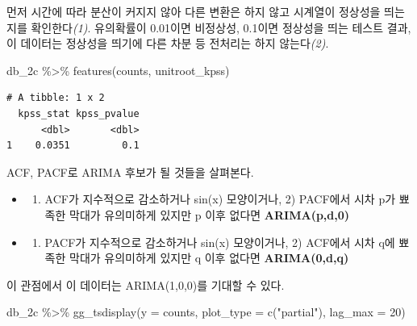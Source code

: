 \documentclass[
  letterpaper,
  DIV=11,
  numbers=noendperiod]{scrreprt}
\newenvironment{Shaded}{\begin{snugshade}}{\end{snugshade}}
\newcommand{\AttributeTok}[1]{\textcolor[rgb]{0.40,0.45,0.13}{#1}}
\newcommand{\DecValTok}[1]{\textcolor[rgb]{0.68,0.00,0.00}{#1}}
\newcommand{\FunctionTok}[1]{\textcolor[rgb]{0.28,0.35,0.67}{#1}}
\newcommand{\NormalTok}[1]{\textcolor[rgb]{0.00,0.23,0.31}{#1}}
\newcommand{\SpecialCharTok}[1]{\textcolor[rgb]{0.37,0.37,0.37}{#1}}
\newcommand{\StringTok}[1]{\textcolor[rgb]{0.13,0.47,0.30}{#1}}
\providecommand{\tightlist}{%
  \setlength{\itemsep}{0pt}\setlength{\parskip}{0pt}}\usepackage{longtable,booktabs,array}
\begin{document}
먼저 시간에 따라 분산이 커지지 않아 다른 변환은 하지 않고 시계열이
정상성을 띄는 지를 확인한다\emph{(1)}. 유의확률이 0.01이면 비정상성,
0.1이면 정상성을 띄는 테스트 결과, 이 데이터는 정상성을 띄기에 다른 차분
등 전처리는 하지 않는다\emph{(2)}.

\begin{Shaded}
\begin{Highlighting}[]
\NormalTok{db\_2c }\SpecialCharTok{\%\textgreater{}\%}
  \FunctionTok{features}\NormalTok{(counts, unitroot\_kpss)}
\end{Highlighting}
\end{Shaded}

\begin{verbatim}
# A tibble: 1 x 2
  kpss_stat kpss_pvalue
      <dbl>       <dbl>
1    0.0351         0.1
\end{verbatim}

ACF, PACF로 ARIMA 후보가 될 것들을 살펴본다.

\begin{itemize}
\item
  \begin{enumerate}
  \def\labelenumi{\arabic{enumi})}
  \tightlist
  \item
    ACF가 지수적으로 감소하거나 sin(x) 모양이거나, 2) PACF에서 시차 p가
    뾰족한 막대가 유의미하게 있지만 p 이후 없다면 \textbf{ARIMA(p,d,0)}
  \end{enumerate}
\item
  \begin{enumerate}
  \def\labelenumi{\arabic{enumi})}
  \tightlist
  \item
    PACF가 지수적으로 감소하거나 sin(x) 모양이거나, 2) ACF에서 시차 q에
    뾰족한 막대가 유의미하게 있지만 q 이후 없다면 \textbf{ARIMA(0,d,q)}
  \end{enumerate}
\end{itemize}

이 관점에서 이 데이터는 ARIMA(1,0,0)를 기대할 수 있다.

\begin{Shaded}
\begin{Highlighting}[]
\NormalTok{db\_2c }\SpecialCharTok{\%\textgreater{}\%} \FunctionTok{gg\_tsdisplay}\NormalTok{(}\AttributeTok{y =}\NormalTok{ counts, }\AttributeTok{plot\_type =} \FunctionTok{c}\NormalTok{(}\StringTok{"partial"}\NormalTok{), }\AttributeTok{lag\_max =} \DecValTok{20}\NormalTok{)}
\end{Highlighting}
\end{Shaded}
\end{document}
